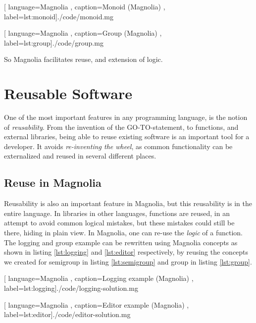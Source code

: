\begin{center}
  
    [ language=Magnolia
    , caption={Monoid (Magnolia)}
    , label=lst:monoid]{./code/monoid.mg}
\end{center}

\begin{center}
  
    [ language=Magnolia
    , caption={Group (Magnolia)}
    , label=lst:group]{./code/group.mg}
\end{center}

So Magnolia facilitates reuse, and extension of logic. 

\section{Reusable Software}

One of the most important features in any programming language, is the notion
of \textit{reusability}. From the invention of the GO-TO-statement,
to functions, and external libraries, being able to reuse existing software is
an important tool for a developer. It avoids \textit{re-inventing the wheel}, as
common functionality can be externalized and reused in several different places.

\subsection{Reuse in Magnolia}

Reusability is also an important feature in Magnolia, but this reusability is in
the entire language. In libraries in other languages, functions are reused, in
an attempt to avoid common logical mistakes, but these mistakes could still be
there, hiding in plain view. In Magnolia, one can re-use the \textit{logic} of a
function. The logging and group example can be rewritten using Magnolia concepts
as shown in listing \ref{lst:logging} and \ref{lst:editor} respectively, by
reusing the concepts we created for semigroup in listing \ref{lst:semigroup} and group
in listing \ref{lst:group}.

\begin{center}
  
    [ language=Magnolia
    , caption={Logging example (Magnolia)}
    , label=lst:logging]{./code/logging-solution.mg}
\end{center}

\begin{center}
  
    [ language=Magnolia
    , caption={Editor example (Magnolia)}
    , label=lst:editor]{./code/editor-solution.mg}
\end{center}

